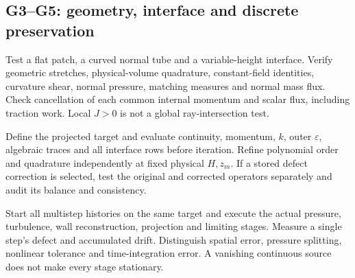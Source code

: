 \documentclass[11pt,a4paper]{article}
\numberwithin{equation}{section}
\newcommand{\eps}{\varepsilon}
\begin{document}
\subsection{G3--G5: geometry, interface and discrete preservation}
\begin{description}[style=nextline,leftmargin=2.6em]
\item[G3: geometry and conservation.]
Test a flat patch, a curved normal tube and a variable-height interface.
Verify geometric stretches, physical-volume quadrature, constant-field
identities, curvature shear, normal pressure, matching measures and
normal mass flux. Check cancellation of each common internal momentum
and scalar flux, including traction work. Local $J>0$ is not a global
ray-intersection test.
\item[G4: assembled stationary residual.]
Define the projected target and evaluate continuity, momentum, $k$,
outer $\eps$, algebraic traces and all interface rows before iteration.
Refine polynomial order and quadrature independently at fixed physical
$H,z_m$. If a stored defect correction is selected, test the original
and corrected operators separately and audit its balance and consistency.
\item[G5: full timestep fixed point.]
Start all multistep histories on the same target and execute the actual
pressure, turbulence, wall reconstruction, projection and limiting
stages. Measure a single step's defect and accumulated drift.
Distinguish spatial error, pressure splitting, nonlinear tolerance
and time-integration error. A vanishing continuous source does not
make every stage stationary.
\end{description}
\end{document}
